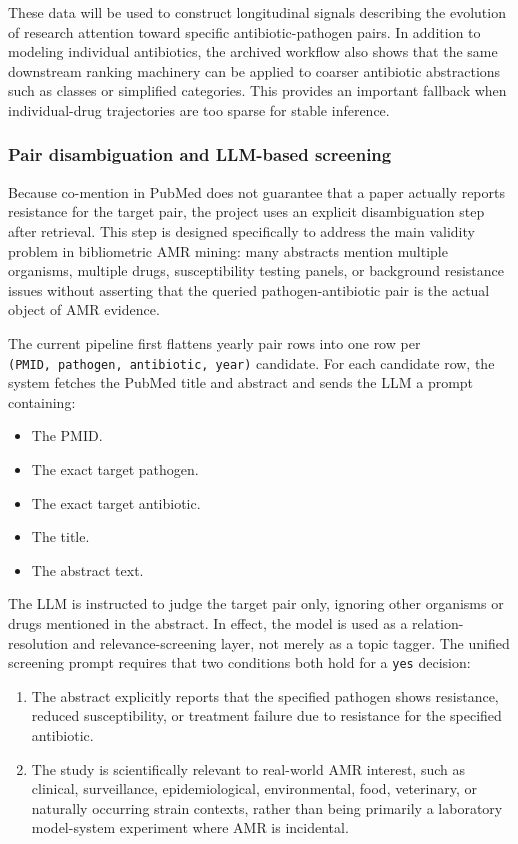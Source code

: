 \documentclass[
]{article}
\providecommand{\tightlist}{%
  \setlength{\itemsep}{0pt}\setlength{\parskip}{0pt}}
\begin{document}
These data will be used to construct longitudinal signals describing the
evolution of research attention toward specific antibiotic-pathogen
pairs. In addition to modeling individual antibiotics, the archived
workflow also shows that the same downstream ranking machinery can be
applied to coarser antibiotic abstractions such as classes or simplified
categories. This provides an important fallback when individual-drug
trajectories are too sparse for stable inference.

\subsubsection{Pair disambiguation and LLM-based
screening}\label{411-pair-disambiguation-and-llm-based-screening}

Because co-mention in PubMed does not guarantee that a paper actually
reports resistance for the target pair, the project uses an explicit
disambiguation step after retrieval. This step is designed specifically
to address the main validity problem in bibliometric AMR mining: many
abstracts mention multiple organisms, multiple drugs, susceptibility
testing panels, or background resistance issues without asserting that
the queried pathogen-antibiotic pair is the actual object of AMR
evidence.

The current pipeline first flattens yearly pair rows into one row per
\texttt{(PMID,\ pathogen,\ antibiotic,\ year)} candidate. For each
candidate row, the system fetches the PubMed title and abstract and
sends the LLM a prompt containing:

\begin{itemize}
\tightlist
\item
  The PMID.
\item
  The exact target pathogen.
\item
  The exact target antibiotic.
\item
  The title.
\item
  The abstract text.
\end{itemize}

The LLM is instructed to judge the target pair only, ignoring other
organisms or drugs mentioned in the abstract. In effect, the model is
used as a relation-resolution and relevance-screening layer, not merely
as a topic tagger. The unified screening prompt requires that two
conditions both hold for a \texttt{yes} decision:

\begin{enumerate}
\def\labelenumi{\arabic{enumi}.}
\tightlist
\item
  The abstract explicitly reports that the specified pathogen shows
  resistance, reduced susceptibility, or treatment failure due to
  resistance for the specified antibiotic.
\item
  The study is scientifically relevant to real-world AMR interest, such
  as clinical, surveillance, epidemiological, environmental, food,
  veterinary, or naturally occurring strain contexts, rather than being
  primarily a laboratory model-system experiment where AMR is
  incidental.
\end{enumerate}
\end{document}
